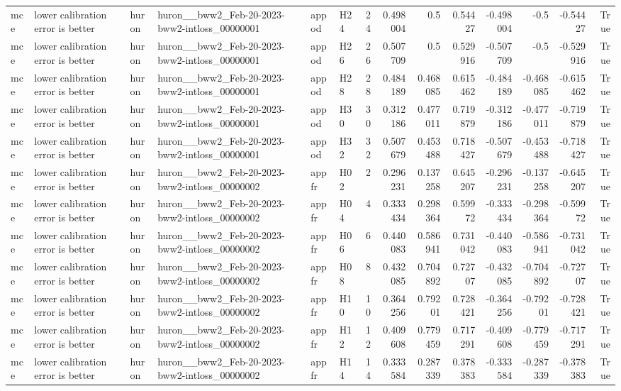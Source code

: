 \begin{longtable}{llllllrrrrrrrr}
mce & lower calibration error is better & huron & huron\_\_bww2\_Feb-20-2023-bww2-intloss\_00000001 & appod & H24 & 24 & 0.498004 & 0.5 & 0.54427 & -0.498004 & -0.5 & -0.54427 & True \\
mce & lower calibration error is better & huron & huron\_\_bww2\_Feb-20-2023-bww2-intloss\_00000001 & appod & H26 & 26 & 0.507709 & 0.5 & 0.529916 & -0.507709 & -0.5 & -0.529916 & True \\
mce & lower calibration error is better & huron & huron\_\_bww2\_Feb-20-2023-bww2-intloss\_00000001 & appod & H28 & 28 & 0.484189 & 0.468085 & 0.615462 & -0.484189 & -0.468085 & -0.615462 & True \\
mce & lower calibration error is better & huron & huron\_\_bww2\_Feb-20-2023-bww2-intloss\_00000001 & appod & H30 & 30 & 0.312186 & 0.477011 & 0.719879 & -0.312186 & -0.477011 & -0.719879 & True \\
mce & lower calibration error is better & huron & huron\_\_bww2\_Feb-20-2023-bww2-intloss\_00000001 & appod & H32 & 32 & 0.507679 & 0.453488 & 0.718427 & -0.507679 & -0.453488 & -0.718427 & True \\
mce & lower calibration error is better & huron & huron\_\_bww2\_Feb-20-2023-bww2-intloss\_00000002 & appfr & H02 & 2 & 0.296231 & 0.137258 & 0.645207 & -0.296231 & -0.137258 & -0.645207 & True \\
mce & lower calibration error is better & huron & huron\_\_bww2\_Feb-20-2023-bww2-intloss\_00000002 & appfr & H04 & 4 & 0.333434 & 0.298364 & 0.59972 & -0.333434 & -0.298364 & -0.59972 & True \\
mce & lower calibration error is better & huron & huron\_\_bww2\_Feb-20-2023-bww2-intloss\_00000002 & appfr & H06 & 6 & 0.440083 & 0.586941 & 0.731042 & -0.440083 & -0.586941 & -0.731042 & True \\
mce & lower calibration error is better & huron & huron\_\_bww2\_Feb-20-2023-bww2-intloss\_00000002 & appfr & H08 & 8 & 0.432085 & 0.704892 & 0.72707 & -0.432085 & -0.704892 & -0.72707 & True \\
mce & lower calibration error is better & huron & huron\_\_bww2\_Feb-20-2023-bww2-intloss\_00000002 & appfr & H10 & 10 & 0.364256 & 0.79201 & 0.728421 & -0.364256 & -0.79201 & -0.728421 & True \\
mce & lower calibration error is better & huron & huron\_\_bww2\_Feb-20-2023-bww2-intloss\_00000002 & appfr & H12 & 12 & 0.409608 & 0.779459 & 0.717291 & -0.409608 & -0.779459 & -0.717291 & True \\
mce & lower calibration error is better & huron & huron\_\_bww2\_Feb-20-2023-bww2-intloss\_00000002 & appfr & H14 & 14 & 0.333584 & 0.287339 & 0.378383 & -0.333584 & -0.287339 & -0.378383 & True \\

\end{longtable}
